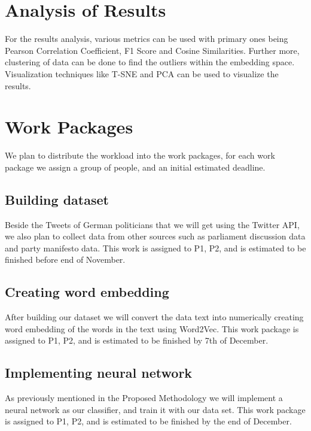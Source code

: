 \documentclass[10pt, oneside]{article}
\begin{document}
\begin{multicols}{2}
\section{Analysis of Results}

For the results analysis, various metrics can be used with primary ones being Pearson Correlation Coefficient, F1 Score and Cosine Similarities. Further more, clustering of data can be done to find the outliers within the embedding space. Visualization techniques like T-SNE and PCA can be used to visualize the results. 

\section{Work Packages}
We plan to distribute the workload into the work packages, for each work package we assign a group of people, and an initial estimated deadline.

\subsection{Building dataset}
Beside the Tweets of German politicians that we will get using the Twitter API, we also plan to collect data from other sources such as parliament discussion data and party manifesto data. This work is assigned to P1, P2, and is estimated to be finished before end of November.

\subsection{Creating word embedding}
After building our dataset we will convert the data text into numerically creating word embedding of the words in the text using Word2Vec. This work package is assigned to P1, P2, and is estimated to be finished by 7th of December.

\subsection{Implementing neural network}
As previously mentioned in the Proposed Methodology we will implement a neural network as our classifier, and train it with our data set.  This work package is assigned to P1, P2, and is estimated to be finished by the end of December.








\end{multicols}
\end{document}
